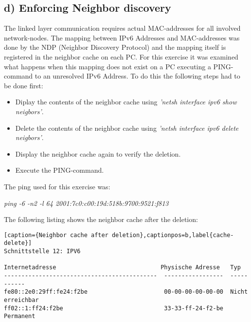 \subsection{d) Enforcing Neighbor discovery}
The linked layer communication requires actual MAC-addresses for all involved network-nodes. The mapping between IPv6 Addresses and MAC-addresses was done by the NDP (Neighbor Discovery Protocol) and the mapping itself is registered in the neighbor cache on each PC. For this exercise it was examined what happens when this mapping does not exist on a PC executing a PING-command to an unresolved IPv6 Address. To do this the following steps had to be done first:
\begin{itemize}
	\item Diplay the contents of the neighbor cache using \textit{'netsh interface ipv6 show neigbors'}.
	\item Delete the contents of the neighbor cache using \textit{'netsh interface ipv6 delete neigbors'}.
	\item Display the neighbor cache again to verify the deletion.
	\item Execute the PING-command.
\end{itemize}
The ping used for this exercise was:
\begin{center}
	\textit{ping -6 -n2 -l 64 2001:7c0:c00:19d:518b:9700:9521:f813}
\end{center}
The following listing shows the neighbor cache after the deletion:
\begin{lstlisting}[caption={Neighbor cache after deletion},captionpos=b,label{cache-delete}]
Schnittstelle 12: IPV6

Internetadresse                              Physische Adresse   Typ
--------------------------------------------  -----------------  -----------
fe80::2e0:29ff:fe24:f2be                      00-00-00-00-00-00  Nicht erreichbar
ff02::1:ff24:f2be                             33-33-ff-24-f2-be  Permanent
\end{lstlisting}

